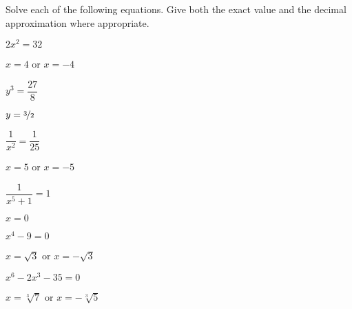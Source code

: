 \begin{exercises}
\begin{problem}
Solve each of the following equations. Give both the exact value 
and the decimal approximation where appropriate.
\begin{multicols}{3}
	\begin{subproblem}
		$2x^2=32$
		\begin{shortsolution}
			$x=4$ or $x=-4$
		\end{shortsolution}
	\end{subproblem}
	\begin{subproblem}
		$y^3=\dfrac{27}{8}$
		\begin{shortsolution}
			$y=\nicefrac{3}{2}$
		\end{shortsolution}
	\end{subproblem}
	\begin{subproblem}
		$\dfrac{1}{x^2}=\dfrac{1}{25}$
		\begin{shortsolution}
			$x= 5$ or $x=-5$
		\end{shortsolution}
	\end{subproblem}
	\begin{subproblem}
		$\dfrac{1}{x^5+1}=1$
		\begin{shortsolution}
			$x=0$ 
		\end{shortsolution}
	\end{subproblem}
	\begin{subproblem}
		$x^4-9=0$
		\begin{shortsolution}
			$x=\sqrt{3}$ or $x=-\sqrt{3}$
		\end{shortsolution}
	\end{subproblem}
	\begin{subproblem}
		$x^6-2x^3-35=0$    %
		\begin{shortsolution}
			$x=\sqrt[3]{7}$ or $x=-\sqrt[3]{5}$
		\end{shortsolution}
	\end{subproblem}
\end{multicols}
\end{problem}
			

\end{exercises}
